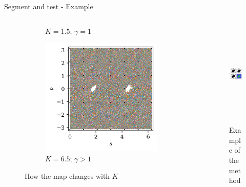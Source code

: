 \documentclass[10pt]{beamer}
\begin{document}
\begin{frame}{Segment and test - Example}
\begin{columns}[t]
\begin{column}{0.5\textwidth}
\begin{figure}
\begin{subfigure}[t]{0.4\textwidth}
                \caption*{$K = 1.5$; $\gamma = 1$}
            \end{subfigure}
            \begin{subfigure}[t]{0.4\textwidth}
                \includegraphics[width=\textwidth]{std/map_1_6.5000.png}
                \caption*{$K = 6.5$; $\gamma > 1$}
            \end{subfigure}
            \caption*{How the map changes with $K$}
        \end{figure}
        
        \end{column}

        

        \begin{column}{0.5\textwidth}
            \begin{figure}
                \includegraphics[height = 5cm]{std/mix.png}
                \caption*{Example of the method}
            \end{figure}   
        \end{column}
        
    \end{columns}

\end{frame}
\end{document}
